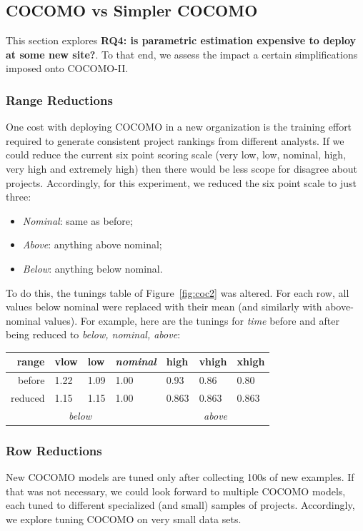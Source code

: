 \documentclass{sig-alternate}
\newcommand{\bi}{\begin{itemize}}
\newcommand{\ei}{\end{itemize}}
\newcommand{\fig}[1]{Figure~\ref{fig:#1}}
\begin{document}
\subsection{COCOMO vs Simpler COCOMO}\label{sect:simpler}
This section explores {\bf RQ4:
is parametric estimation expensive to deploy
at some new site?}. To that end,
we assess the impact
a certain simplifications imposed onto COCOMO-II. 




\subsubsection{Range Reductions}
One cost with deploying COCOMO in a new
organization is the training effort required to generate consistent project
rankings from different analysts. If we could reduce 
the current six
point scoring scale (very low, low, nominal, high, very high and extremely high)
then there would be less scope 
for disagree about projects. 
Accordingly, for this experiment, 
we reduced the  six point scale to just three:
\bi
\item {\em Nominal}: same as before;
\item {\em Above}: anything above nominal;
\item {\em Below}: anything below nominal.
\ei
To do  this, the tunings table of
\fig{coc2} was altered. For each row, all values
below nominal were replaced with their mean (and
similarly with above-nominal values).  For example,
here are the tunings for {\em time} before and after
being reduced to {\em below, nominal, above}:

{\scriptsize   \begin{center}
\begin{tabular}{r|ll|l|lll|}

      range      & vlow&  low&{\em nominal}&high&vhigh&xhigh\\\hline
     before & 1.22& 1.09& 1.00& 0.93& 0.86& 0.80\\
     reduced&1.15& 1.15& 1.00&  0.863& 0.863&0.863\\\cline{2-3}\cline{5-7}
                 & \multicolumn{2}{c|}{{\em below}} &&\multicolumn{3}{c|}{{\em above}}
\end{tabular}
\end{center}}


\subsubsection{Row Reductions}
New COCOMO models are tuned only after collecting
100s of new examples. If that was not necessary, we could look forward to multiple
COCOMO models, each tuned to different specialized (and small) samples of projects.
Accordingly, we explore tuning COCOMO
on very small data sets.
\end{document}
